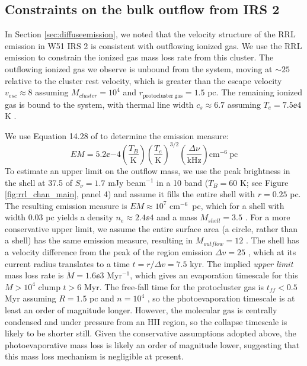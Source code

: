 \subsection{Constraints on the bulk outflow from IRS 2}
\label{sec:irs2outflow}
In Section \ref{sec:diffuseemission}, we noted that the velocity structure of
the RRL emission in W51 IRS 2 is consistent with outflowing ionized gas.  We use
the RRL emission to constrain the ionized gas mass loss rate from this cluster.
The outflowing ionized gas we observe is unbound from the system, moving at
$\sim25$ \kms relative to the cluster rest velocity, which is greater than the
escape velocity $v_{esc}\approx8$ \kms assuming $M_{cluster}=10^4$ \msun and
$r_{\mathrm{protocluster~gas}}=1.5$ pc.  The remaining ionized gas is bound to the system, with
thermal line width $c_s\approx6.7$ \kms assuming $T_e=7.5\ee{4}$ K \citep{Ginsburg2015a}.

We use Equation 14.28 of \citet{Wilson2009a} to determine the emission measure:
\begin{equation}
    EM = 5.2\ee{-4} 
    \left(\frac{T_B}{\mathrm{K}}\right)
    \left(\frac{T_e}{\mathrm{K}}\right)^{3/2} \left(\frac{\Delta
    \nu}{\mathrm{kHz}}\right) \mathrm{cm}^{-6}\mathrm{~pc}
\end{equation}
To estimate an upper limit on the outflow mass, we use the peak brightness in the shell at 37.5
\kms of $S_\nu=1.7$ mJy beam$^{-1}$ in a 10 \kms band ($T_B=60$ K;
 see Figure
\ref{fig:rrl_chan_main}, panel 4) and assume it fills the entire shell with
$r=0.25$ pc.  The resulting emission measure is $EM\approx10^7$ cm$^{-6}$~pc,
which for a shell with width 0.03 pc yields a density $n_e\approx2.4\ee{4}$
\percc and a mass $M_{shell}=3.5$ \msun.  For a more conservative upper limit,
we assume the entire surface area (a circle, rather than a shell) has the same
emission measure, resulting in $M_{outflow}=12$ \msun.  The shell has a velocity
difference from the peak of the \hii region emission $\Delta v=25$ \kms, which
at its current radius translates to a time $t = r / \Delta v = 7.5$ kyr.
The implied \emph{upper limit} mass loss rate is $\dot{M} = 1.6\ee{3}$ \msun
Myr$^{-1}$, which gives an evaporation timescale for this $M>10^4$ \msun
clump $t>6$ Myr.  The free-fall time for the protocluster gas is $t_{ff} < 0.5$ Myr
assuming $R=1.5$ pc and $n=10^4$ \percc, so the photoevaporation timescale is
at least an order of magnitude longer.  However, the molecular gas is centrally
condensed and under pressure from an HII region, so the collapse timescale is
likely to be shorter still.
Given the conservative assumptions adopted above, the photoevaporative mass
loss is likely an order of magnitude lower, suggesting that this mass loss
mechanism is negligible at present.


